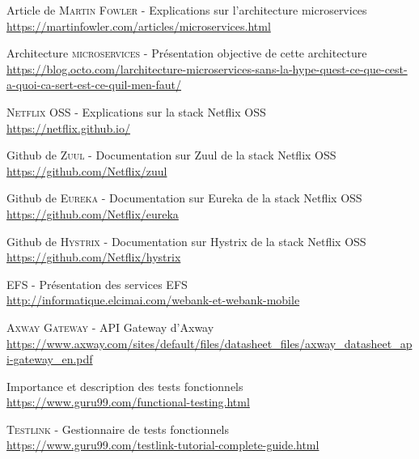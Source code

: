 \documentclass[11pt,twoside]{scrreprt}
\begin{document}
	
\begin{thebibliography}{9}

%

		Article de \textsc{Martin Fowler - }\textsf{Explications sur l'architecture microservices} \\
		\url{https://martinfowler.com/articles/microservices.html}

		Architecture \textsc{ microservices - }\textsf{Présentation objective de cette architecture} \\
		\url{https://blog.octo.com/larchitecture-microservices-sans-la-hype-quest-ce-que-cest-a-quoi-ca-sert-est-ce-quil-men-faut/}
		
		\textsc{Netflix OSS - }\textsf{Explications sur la stack Netflix OSS} \\
		\url{https://netflix.github.io/}

		Github de \textsc{Zuul - }\textsf{Documentation sur Zuul de la stack Netflix OSS} \\
		\url{https://github.com/Netflix/zuul}
		
		Github de \textsc{Eureka - }\textsf{Documentation sur Eureka de la stack Netflix OSS} \\
		\url{https://github.com/Netflix/eureka}

		Github de \textsc{Hystrix - }\textsf{Documentation sur Hystrix de la stack Netflix OSS} \\
		\url{https://github.com/Netflix/hystrix}

		\textsc{EFS - }\textsf{Présentation des services EFS} \\
		\url{http://informatique.elcimai.com/webank-et-webank-mobile}
		
		\textsc{Axway Gateway - }\textsf{API Gateway d'Axway} \\
		\url{https://www.axway.com/sites/default/files/datasheet_files/axway_datasheet_api-gateway_en.pdf}
		
		\textsf{Importance et description des tests fonctionnels} \\
		\url{https://www.guru99.com/functional-testing.html}

		\textsc{Testlink - }\textsf{Gestionnaire de tests fonctionnels} \\
		\url{https://www.guru99.com/testlink-tutorial-complete-guide.html}


\end{thebibliography}
\end{document}
